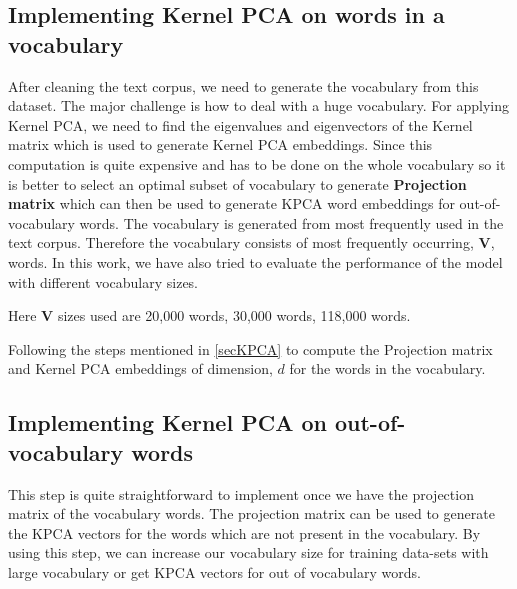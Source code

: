  \subsection{Implementing Kernel PCA on words in a vocabulary}\label{sub:vw}
 After cleaning the text corpus, we need to generate the vocabulary from this dataset. The major challenge is how to deal with a huge vocabulary. For applying Kernel PCA, we need to find the eigenvalues and eigenvectors of the Kernel matrix which is used to generate Kernel PCA embeddings. Since this computation is quite expensive and has to be done on the whole vocabulary so it is better to select an optimal subset of vocabulary to generate \textbf{Projection matrix} which can then be used to generate KPCA word embeddings for out-of-vocabulary words. The vocabulary is generated from most frequently used in the text corpus. Therefore the vocabulary consists of most frequently occurring, $\mathbf{V}$, words. In this work, we have also tried to evaluate the performance of the model with different vocabulary sizes.\\ 
\begin{center}
Here $\mathbf{V}$ sizes used are 20,000 words, 30,000 words, 118,000 words.
\end{center}
 Following the steps mentioned in \ref{secKPCA} to compute the Projection matrix and Kernel PCA embeddings of dimension, $d$ for the words in the vocabulary.
 
 \subsection{Implementing Kernel PCA on out-of-vocabulary words}\label{oov}
 This step is quite straightforward to implement once we have the projection matrix of the vocabulary words. The projection matrix can be used to generate the KPCA vectors for the words which are not present in the vocabulary. By using this step, we can increase our vocabulary size for training data-sets with large vocabulary or get KPCA vectors for out of vocabulary words.\\
 
